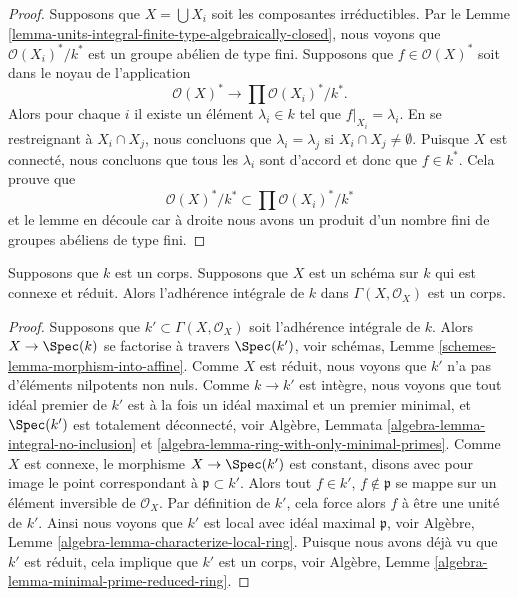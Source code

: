 \begin{proof}
Supposons que $X = \bigcup X_i$ soit les composantes
irréductibles. Par le Lemme
\ref{lemma-units-integral-finite-type-algebraically-closed}, nous
voyons que $\mathcal{O}(X_i)^*/k^*$ est un groupe abélien de type fini.
Supposons que $f \in \mathcal{O}(X)^*$ soit dans le noyau de l'application
$$
\mathcal{O}(X)^* \longrightarrow \prod \mathcal{O}(X_i)^*/k^*.
$$
Alors pour chaque $i$ il existe un élément $\lambda_i
\in k$ tel que $f|_{X_i} = \lambda_i$. En se
restreignant à $X_i \cap X_j$, nous concluons que
$\lambda_i = \lambda_j$ si $X_i \cap X_j \not = \emptyset$.
Puisque $X$ est connecté, nous concluons que tous les
$\lambda_i$ sont d'accord et donc que $f \in k^*$. Cela prouve que
$$
\mathcal{O}(X)^*/k^* \subset \prod \mathcal{O}(X_i)^*/k^*
$$
et le lemme en découle car à droite nous avons un
produit d’un nombre fini de groupes abéliens de type fini.
\end{proof}

\begin{lemma}
\label{lemma-integral-closure-ground-field}
Supposons que $k$ est un corps. Supposons que
$X$ est un schéma sur $k$ qui est connexe et
réduit. Alors l'adhérence intégrale de $k$
dans $\Gamma(X, \mathcal{O}_X)$ est un corps.
\end{lemma}

\begin{proof}
Supposons que $k' \subset \Gamma(X, \mathcal{O}_X)$ soit
l'adhérence intégrale de $k$. Alors $X \to \Spec(k)$ se
factorise à travers $\Spec(k')$, voir schémas, Lemme
\ref{schemes-lemma-morphism-into-affine}. Comme $X$ est réduit,
nous voyons que $k'$ n'a pas d'éléments nilpotents non nuls.
Comme $k \to k'$ est intègre, nous voyons que tout idéal
premier de $k'$ est à la fois un idéal maximal et un premier
minimal, et $\Spec(k')$ est totalement déconnecté, voir Algèbre,
Lemmata \ref{algebra-lemma-integral-no-inclusion} et
\ref{algebra-lemma-ring-with-only-minimal-primes}. Comme $X$ est
connexe, le morphisme $X \to \Spec(k')$ est constant, disons avec
pour image le point correspondant à $\mathfrak p \subset k'$.
Alors tout $f \in k'$, $f \not \in \mathfrak p$ se mappe sur un
élément inversible de $\mathcal{O}_X$. Par définition de $k'$,
cela force alors $f$ à être une unité de $k'$. Ainsi nous voyons
que $k'$ est local avec idéal maximal $\mathfrak p$, voir Algèbre,
Lemme \ref{algebra-lemma-characterize-local-ring}. Puisque nous
avons déjà vu que $k'$ est réduit, cela implique que $k'$ est un
corps, voir Algèbre, Lemme \ref{algebra-lemma-minimal-prime-reduced-ring}.
\end{proof}

